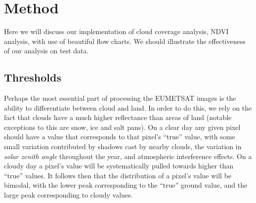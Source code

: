 \section{Method}

Here we will discuss our implementation of cloud coverage analysis,
NDVI analysis, with use of beautiful flow charts. We should illustrate
the effectiveness of our analysis on test data.

\subsection{Thresholds}
Perhaps the most essential part of processing the EUMETSAT images is the ability
to differentiate between cloud and land. In order to do this, we rely on the
fact that clouds have a much higher reflectance than areas of land (notable
exceptions to this are snow, ice and salt pans). On a clear day any given pixel
should have a value that corresponds to that pixel's ``true'' value, with some
small variation contributed by shadows cast by nearby clouds, the variation in
\emph{solar zenith angle} throughout the year, and atmospheric interference
effects. On a cloudy day a pixel's value will be systematically pulled towards
higher than ``true'' values. It follows then that the distribution of a pixel's
value will be bimodal, with the lower peak corresponding to the ``true'' ground
value, and the large peak corresponding to cloudy values.


